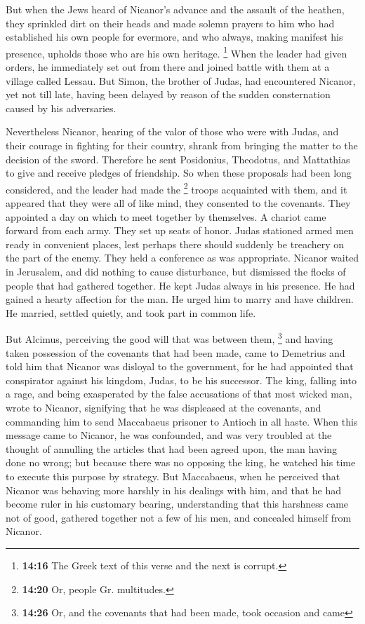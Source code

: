  But when the Jews heard of Nicanor's advance and the
assault of the heathen, they sprinkled dirt on their heads and made
solemn prayers to him who had established his own people for evermore,
and who always, making manifest his presence, upholds those who are his
own heritage.  \footnote{\textbf{14:16} The Greek text of
  this verse and the next is corrupt.} When the leader had given orders,
he immediately set out from there and joined battle with them at a
village called Lessau.  But Simon, the brother of Judas,
had encountered Nicanor, yet not till late, having been delayed by
reason of the sudden consternation caused by his adversaries.

 Nevertheless Nicanor, hearing of the valor of those who
were with Judas, and their courage in fighting for their country, shrank
from bringing the matter to the decision of the sword. 
Therefore he sent Posidonius, Theodotus, and Mattathias to give and
receive pledges of friendship.  So when these proposals
had been long considered, and the leader had made the \footnote{\textbf{14:20}
  Or, people Gr. multitudes.} troops acquainted with them, and it
appeared that they were all of like mind, they consented to the
covenants.  They appointed a day on which to meet
together by themselves. A chariot came forward from each army. They set
up seats of honor.  Judas stationed armed men ready in
convenient places, lest perhaps there should suddenly be treachery on
the part of the enemy. They held a conference as was appropriate.
 Nicanor waited in Jerusalem, and did nothing to cause
disturbance, but dismissed the flocks of people that had gathered
together.  He kept Judas always in his presence. He had
gained a hearty affection for the man.  He urged him to
marry and have children. He married, settled quietly, and took part in
common life.

 But Alcimus, perceiving the good will that was between
them, \footnote{\textbf{14:26} Or, and the covenants that had been made,
  took occasion and came} and having taken possession of the covenants
that had been made, came to Demetrius and told him that Nicanor was
disloyal to the government, for he had appointed that conspirator
against his kingdom, Judas, to be his successor.  The
king, falling into a rage, and being exasperated by the false
accusations of that most wicked man, wrote to Nicanor, signifying that
he was displeased at the covenants, and commanding him to send
Maccabaeus prisoner to Antioch in all haste.  When this
message came to Nicanor, he was confounded, and was very troubled at the
thought of annulling the articles that had been agreed upon, the man
having done no wrong;  but because there was no opposing
the king, he watched his time to execute this purpose by strategy.
 But Maccabaeus, when he perceived that Nicanor was
behaving more harshly in his dealings with him, and that he had become
ruler in his customary bearing, understanding that this harshness came
not of good, gathered together not a few of his men, and concealed
himself from Nicanor.


